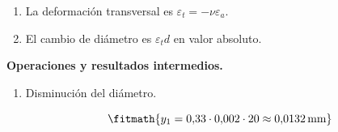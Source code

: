 \begin{enumerate}

\item La deformación transversal es $\varepsilon_t = -\nu\varepsilon_a$.

\item El cambio de diámetro es $\varepsilon_t d$ en valor absoluto.

\end{enumerate}

\noindent\textbf{Operaciones y resultados intermedios.}

\begin{enumerate}

\item Disminución del diámetro.

\[\fitmath{y_{1}=0{,}33\cdot 0{,}002\cdot 20\approx 0{,}0132\,\mathrm{mm}}\]

\end{enumerate}
